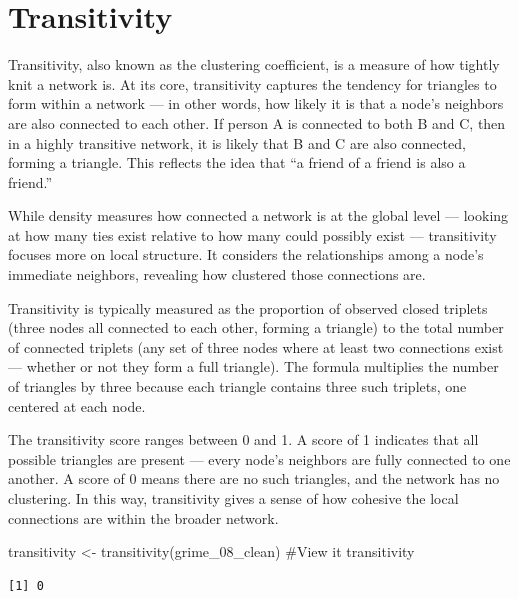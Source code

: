 \documentclass[
  letterpaper,
  DIV=11,
  numbers=noendperiod]{scrreprt}
\newenvironment{Shaded}{\begin{snugshade}}{\end{snugshade}}
\newcommand{\CommentTok}[1]{\textcolor[rgb]{0.37,0.37,0.37}{#1}}
\newcommand{\FunctionTok}[1]{\textcolor[rgb]{0.28,0.35,0.67}{#1}}
\newcommand{\NormalTok}[1]{\textcolor[rgb]{0.00,0.23,0.31}{#1}}
\newcommand{\OtherTok}[1]{\textcolor[rgb]{0.00,0.23,0.31}{#1}}
\begin{document}
\section{Transitivity}\label{transitivity}

Transitivity, also known as the clustering coefficient, is a measure of
how tightly knit a network is. At its core, transitivity captures the
tendency for triangles to form within a network --- in other words, how
likely it is that a node's neighbors are also connected to each other.
If person A is connected to both B and C, then in a highly transitive
network, it is likely that B and C are also connected, forming a
triangle. This reflects the idea that ``a friend of a friend is also a
friend.''

While density measures how connected a network is at the global level
--- looking at how many ties exist relative to how many could possibly
exist --- transitivity focuses more on local structure. It considers the
relationships among a node's immediate neighbors, revealing how
clustered those connections are.

Transitivity is typically measured as the proportion of observed closed
triplets (three nodes all connected to each other, forming a triangle)
to the total number of connected triplets (any set of three nodes where
at least two connections exist --- whether or not they form a full
triangle). The formula multiplies the number of triangles by three
because each triangle contains three such triplets, one centered at each
node.

The transitivity score ranges between 0 and 1. A score of 1 indicates
that all possible triangles are present --- every node's neighbors are
fully connected to one another. A score of 0 means there are no such
triangles, and the network has no clustering. In this way, transitivity
gives a sense of how cohesive the local connections are within the
broader network.

\begin{Shaded}
\begin{Highlighting}[]
\NormalTok{transitivity }\OtherTok{\textless{}{-}} \FunctionTok{transitivity}\NormalTok{(grime\_08\_clean)}
\CommentTok{\#View it}
\NormalTok{transitivity}
\end{Highlighting}
\end{Shaded}

\begin{verbatim}
[1] 0
\end{verbatim}
\end{document}
